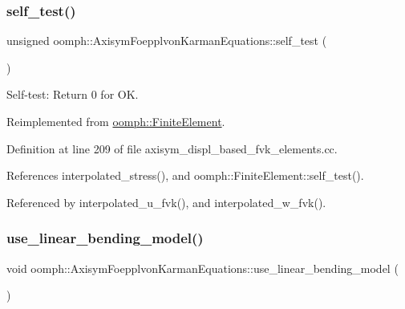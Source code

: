 \mbox{\label{classoomph_1_1AxisymFoepplvonKarmanEquations_a2ececacf1a7dd89188a4a20e5abbb7c0}} 
\subsubsection{\texorpdfstring{self\+\_\+test()}{self\_test()}\hspace{0.1cm}{\footnotesize\ttfamily [2/2]}}
{\footnotesize\ttfamily unsigned oomph\+::\+Axisym\+Foepplvon\+Karman\+Equations\+::self\+\_\+test (\begin{DoxyParamCaption}{ }\end{DoxyParamCaption})\hspace{0.3cm}{\ttfamily [virtual]}}



Self-\/test\+: Return 0 for OK. 



Reimplemented from \hyperlink{classoomph_1_1FiniteElement_af94c5a5e22175d5420b33b3b79e46ed3}{oomph\+::\+Finite\+Element}.



Definition at line 209 of file axisym\+\_\+displ\+\_\+based\+\_\+fvk\+\_\+elements.\+cc.



References interpolated\+\_\+stress(), and oomph\+::\+Finite\+Element\+::self\+\_\+test().



Referenced by interpolated\+\_\+u\+\_\+fvk(), and interpolated\+\_\+w\+\_\+fvk().

\mbox{\label{classoomph_1_1AxisymFoepplvonKarmanEquations_abddb3d7358a6039420bf6ed58e7a5547}} 
\subsubsection{\texorpdfstring{use\+\_\+linear\+\_\+bending\+\_\+model()}{use\_linear\_bending\_model()}\hspace{0.1cm}{\footnotesize\ttfamily [1/2]}}
{\footnotesize\ttfamily void oomph\+::\+Axisym\+Foepplvon\+Karman\+Equations\+::use\+\_\+linear\+\_\+bending\+\_\+model (\begin{DoxyParamCaption}{ }\end{DoxyParamCaption})\hspace{0.3cm}{\ttfamily [inline]}}



